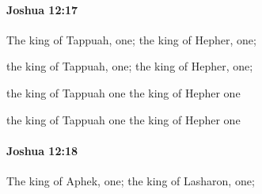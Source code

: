 		\paragraph{Joshua 12:17} %
			\label{JOSHUA-12-17}

			The king of Tappuah, one; the king of Hepher, one;

			\begin{versebox}
					\item[BHS] 
					\item[ASV] the king of Tappuah, one; the king of Hepher, one;
					\item[NIV] the king of Tappuah one the king of Hepher one
					\item[NRSV] the king of Tappuah one the king of Hepher one
			\end{versebox}

		\paragraph{Joshua 12:18} %
			\label{JOSHUA-12-18}

			The king of Aphek, one; the king of Lasharon, one;

